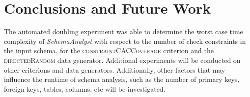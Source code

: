 \documentclass[smallextended]{svjour3}       %
\begin{document}
\section{Conclusions and Future Work}
The automated doubling experiment was able to determine the worst case
time complexity of \textit{SchemaAnalyst} with respect to the number of
check constraints in the input schema, for the
\textsc{constraintCACCoverage} criterion and the
\textsc{directedRandom} data generator.  Additional experiments will be
conducted on other criterions and data generators. Additionally, other factors 
that may influence the runtime of schema analysis,
such as the number of primary keys, foreign keys, tables, columns, etc
will be investigated.


\end{document}
